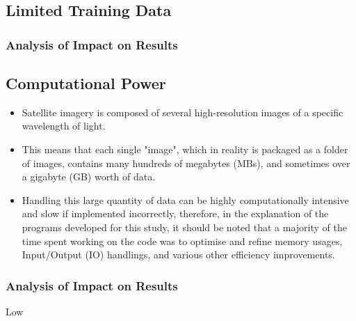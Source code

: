 \subsection{Limited Training Data}
\subsubsection{Analysis of Impact on Results}

\subsection{Computational Power}
\begin{itemize}
    \item Satellite imagery is composed of several high-resolution images of a specific wavelength of light. 
    \item This means that each single "image", which in reality is packaged as a folder of images, contains many hundreds of megabytes (MBs), and sometimes over a gigabyte (GB) worth of data. 
    \item Handling this large quantity of data can be highly computationally intensive and slow if implemented incorrectly, therefore, in the explanation of the programs developed for this study, it should be noted that a majority of the time spent working on the code was to optimise and refine memory usages, Input/Output (IO) handlings, and various other efficiency improvements. 
\end{itemize}
\subsubsection{Analysis of Impact on Results}
Low


